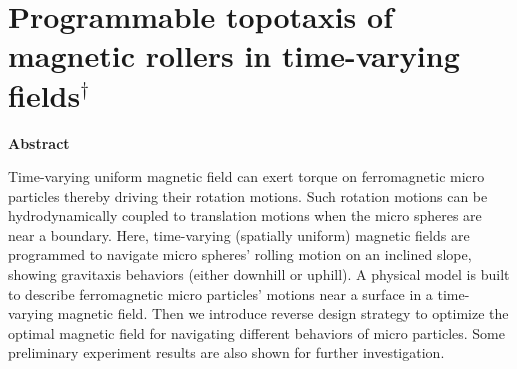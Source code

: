 
\chapter{Programmable topotaxis of magnetic rollers in time-varying  fields$^\dag$}


\begin{center}
\vspace*{1\baselineskip}
\textbf{Abstract}
\end{center}
Time-varying uniform magnetic field can exert torque on ferromagnetic micro particles thereby driving their rotation motions. Such rotation motions can be hydrodynamically coupled to translation motions when the micro spheres are near a boundary. Here, time-varying (spatially uniform) magnetic fields are  programmed to navigate micro spheres' rolling motion on an inclined slope, showing gravitaxis behaviors (either downhill or uphill). A physical model is  built  to describe ferromagnetic micro particles' motions near a surface in a time-varying magnetic field. Then we introduce reverse design strategy to optimize the optimal magnetic field for navigating different behaviors of micro particles. Some preliminary experiment results are also shown for further investigation. 
 
